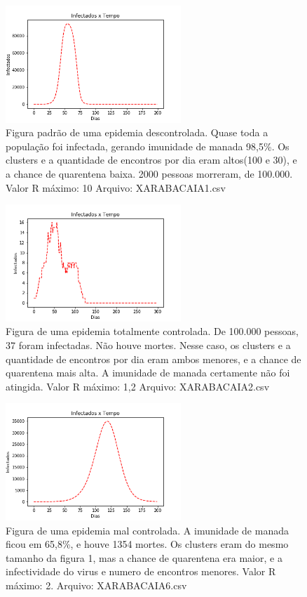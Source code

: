 \documentclass[11pt]{article}
\begin{document}
\begin{figure}[htbp]
\centering
\includegraphics[width=250px]{images/XARABACAIA1.png}
\caption{Figura padrão de uma epidemia descontrolada. Quase toda a população foi infectada, gerando imunidade de manada 98,5\%. Os clusters e a quantidade de encontros por dia eram altos(100 e 30), e a chance de quarentena baixa. 2000 pessoas morreram, de 100.000. Valor R máximo: 10 Arquivo: XARABACAIA1.csv}
\end{figure}
\begin{figure}[htbp]
\centering
\includegraphics[width=250px]{images/XARABACAIA2.png}
\caption{Figura de uma epidemia totalmente controlada. De 100.000 pessoas, 37 foram infectadas. Não houve mortes. Nesse caso, os clusters e a quantidade de encontros por dia eram ambos menores, e a chance de quarentena mais alta. A imunidade de manada certamente não foi atingida. Valor R máximo: 1,2 Arquivo: XARABACAIA2.csv}
\end{figure}
\begin{figure}[htbp]
\centering
\includegraphics[width=250px]{images/XARABACAIA6.png}
\caption{Figura de uma epidemia mal controlada. A imunidade de manada ficou em 65,8\%, e houve 1354 mortes. Os clusters eram do mesmo tamanho da figura 1, mas a chance de quarentena era maior, e a infectividade do virus e numero de encontros menores. Valor R máximo: 2. Arquivo: XARABACAIA6.csv}
\end{figure}
\end{document}
